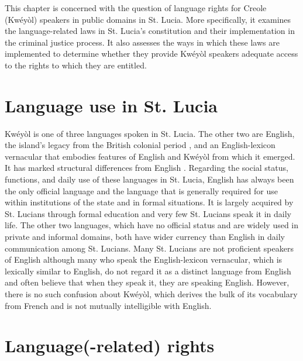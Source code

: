 \documentclass[output=paper,colorlinks,citecolor=brown]{langscibook}
\begin{document}
This chapter is concerned with the question of language rights for Creole (Kwéyòl) speakers in public domains in St. Lucia. More specifically, it examines the language-related laws in St. Lucia’s constitution and their implementation in the criminal justice process. It also assesses the ways in which these laws are implemented to determine whether they provide Kwéyòl speakers adequate access to the rights to which they are entitled.


\section{Language use in St. Lucia}

Kwéyòl is one of three languages spoken in St. Lucia. The other two are English, the island’s legacy from the British colonial period \citep{StHilaire_Aonghas2011}, and an English-lexicon vernacular that embodies features of English and Kwéyòl from which it emerged. It has marked structural differences from English \citep{Simmons-McDonald2014}. Regarding the social status, functions, and daily use of these languages in St. Lucia, English has always been the only official language and the language that is generally required for use within institutions of the state and in formal situations. It is largely acquired by St. Lucians through formal education and very few St. Lucians speak it in daily life. The other two languages, which have no official status and are widely used in private and informal domains, both have wider currency than English in daily communication among St. Lucians. Many St. Lucians are not proficient speakers of English although many who speak the English-lexicon vernacular, which is lexically similar to English, do not regard it as a distinct language from English and often believe that when they speak it, they are speaking English. However, there is no such confusion about Kwéyòl, which derives the bulk of its vocabulary from French and is not mutually intelligible with English. 


\section{Language(-related) rights}
\end{document}
